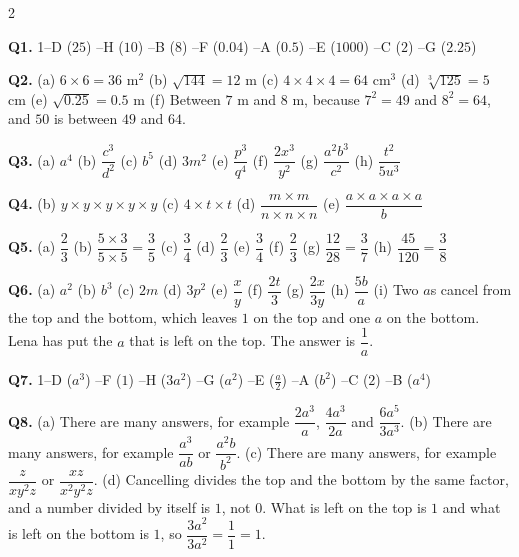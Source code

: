 \documentclass[12pt,a4paper]{article}
\begin{document}
{\small
\begin{multicols}{2}
\raggedcolumns
\setlength{\parskip}{4pt}

\textbf{Q1.} 1--D ($25$) --H ($10$) --B ($8$) --F ($0.04$) --A ($0.5$) --E ($1000$) --C ($2$) --G ($2.25$)

\textbf{Q2.} (a) $6\times6=36$ m$^2$ \quad (b) $\sqrt{144}=12$ m \quad
(c) $4\times4\times4=64$ cm$^3$ \quad (d) $\sqrt[3]{125}=5$ cm \quad
(e) $\sqrt{0.25}=0.5$ m \quad (f) Between $7$ m and $8$ m, because
$7^2=49$ and $8^2=64$, and $50$ is between $49$ and $64$.

\textbf{Q3.} (a) $a^4$ \quad (b) $\dfrac{c^3}{d^2}$ \quad (c) $b^5$ \quad
(d) $3m^2$ \quad (e) $\dfrac{p^3}{q^4}$ \quad (f) $\dfrac{2x^3}{y^2}$ \quad
(g) $\dfrac{a^2b^3}{c^2}$ \quad (h) $\dfrac{t^2}{5u^3}$

\textbf{Q4.} (b) $y\times y\times y\times y\times y$ \quad
(c) $4\times t\times t$ \quad (d) $\dfrac{m\times m}{n\times n\times n}$ \quad
(e) $\dfrac{a\times a\times a\times a}{b}$

\textbf{Q5.} (a) $\dfrac{2}{3}$ \quad
(b) $\dfrac{5\times3}{5\times5}=\dfrac{3}{5}$ \quad (c) $\dfrac{3}{4}$ \quad
(d) $\dfrac{2}{3}$ \quad (e) $\dfrac{3}{4}$ \quad (f) $\dfrac{2}{3}$ \quad
(g) $\dfrac{12}{28}=\dfrac{3}{7}$ \quad (h) $\dfrac{45}{120}=\dfrac{3}{8}$

\textbf{Q6.} (a) $a^2$ \quad (b) $b^3$ \quad (c) $2m$ \quad (d) $3p^2$ \quad
(e) $\dfrac{x}{y}$ \quad (f) $\dfrac{2t}{3}$ \quad (g) $\dfrac{2x}{3y}$
\quad (h) $\dfrac{5b}{a}$ \quad (i) Two $a$s cancel from the top and the
bottom, which leaves $1$ on the top and one $a$ on the bottom. Lena has put the
$a$ that is left on the top. The answer is $\dfrac{1}{a}$.

\textbf{Q7.} 1--D ($a^3$) --F ($1$) --H ($3a^2$) --G ($a^2$) --E ($\frac{a}{2}$) --A ($b^2$) --C ($2$) --B ($a^4$)

\textbf{Q8.} (a) There are many answers, for example $\dfrac{2a^3}{a}$, \;
$\dfrac{4a^3}{2a}$ \; and \; $\dfrac{6a^5}{3a^3}$. \quad (b) There are many
answers, for example $\dfrac{a^3}{ab}$ or $\dfrac{a^2b}{b^2}$. \quad
(c) There are many answers, for example $\dfrac{z}{xy^2z}$ or
$\dfrac{xz}{x^2y^2z}$. \quad (d) Cancelling divides the top and the bottom by the same factor, and a number
divided by itself is $1$, not $0$. What is left on the top is $1$ and what is
left on the bottom is $1$, so $\dfrac{3a^2}{3a^2}=\dfrac{1}{1}=1$.


\end{multicols}}
\end{document}
